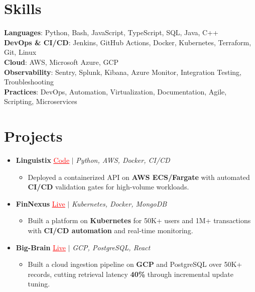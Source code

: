 \documentclass[letterpaper,10pt]{article}
\newcommand{\resumeItem}[1]{\item\small{{#1 \vspace{-2pt}}}}
\newcommand{\resumeProjectHeading}[1]{\item \small #1 \vspace{-2pt}}
\newcommand{\resumeSubHeadingListStart}{\begin{itemize}[leftmargin=0.0in, label={}]}
\newcommand{\resumeSubHeadingListEnd}{\end{itemize}}
\newcommand{\resumeProjItemListStart}{\begin{itemize}[leftmargin=0.15in,label=\textbullet,itemsep=0pt,topsep=0pt,parsep=0pt,partopsep=0pt]}
\newcommand{\resumeProjItemListEnd}{\end{itemize}\vspace{-4pt}}
\begin{document}
\section{Skills}
\begin{itemize}[leftmargin=0.15in, label={}]
\small{\item{
\textbf{Languages}: Python, Bash, JavaScript, TypeScript, SQL, Java, C++ \\
\textbf{DevOps \& CI/CD}: Jenkins, GitHub Actions, Docker, Kubernetes, Terraform, Git, Linux \\
\textbf{Cloud}: AWS, Microsoft Azure, GCP \\
\textbf{Observability}: Sentry, Splunk, Kibana, Azure Monitor, Integration Testing, Troubleshooting \\
\textbf{Practices}: DevOps, Automation, Virtualization, Documentation, Agile, Scripting, Microservices
}}
\end{itemize}
\vspace{-6pt}
\section{Projects}
\resumeSubHeadingListStart
\vspace{-2pt}
\resumeProjectHeading{\textbf{Linguistix} {\href{https://github.com/SAHAJ-BHADJA/Linguistix}{\textcolor{red}{\underline{Code}}}} $|$ \emph{Python, AWS, Docker, CI/CD}}
\resumeProjItemListStart
\resumeItem{Deployed a containerized API on \textbf{AWS ECS/Fargate} with automated \textbf{CI/CD} validation gates for high-volume workloads.}
\resumeProjItemListEnd
\vspace{3pt}
\resumeProjectHeading{\textbf{FinNexus} {\href{https://fin-nexus.vercel.app/}{\textcolor{red}{\underline{Live}}}} $|$ \emph{Kubernetes, Docker, MongoDB}}
\resumeProjItemListStart
\resumeItem{Built a platform on \textbf{Kubernetes} for 50K+ users and 1M+ transactions with \textbf{CI/CD automation} and real-time monitoring.}
\resumeProjItemListEnd
\vspace{3pt}
\resumeProjectHeading{\textbf{Big-Brain} {\href{https://big-brain-pied.vercel.app/}{\textcolor{red}{\underline{Live}}}} $|$ \emph{GCP, PostgreSQL, React}}
\resumeProjItemListStart
\resumeItem{Built a cloud ingestion pipeline on \textbf{GCP} and PostgreSQL over 50K+ records, cutting retrieval latency \textbf{40\%} through incremental update tuning.}
\resumeProjItemListEnd
\resumeSubHeadingListEnd
\end{document}
